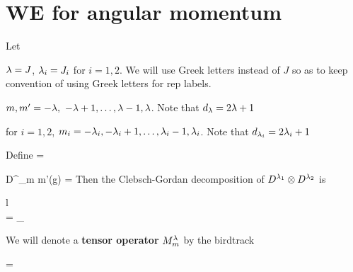 \section{WE for angular momentum}
Let

$\lambda=J$, $\lambda_i=J_i$ for $i=1,2$.
We will use Greek letters instead of $J$
so as to keep
convention
of using Greek
letters for rep labels. 

$m, m'= -\lambda, \
-\lambda+1,\ldots, \lambda-1, \lambda$. Note that
$d_\lambda = 2\lambda + 1$
 
for $i=1,2$, $m_i= -\lambda_i, -\lambda_i +1,\ldots, \lambda_i-1, \lambda_i$.  Note
that
$d_{\lambda_i} = 2\lambda_i + 1$ 



Define
\beq
{}
\quad
=\quad
\bcen
{}
\ecen
\eeq

\beq
D^\lam_{m m'}(g)
\quad =\quad
{}
\eeq
Then
the Clebsch-Gordan decomposition of $D^{\lambda_1}\otimes D^{\lambda_2}$ is

\beq
\begin{array}{l}
\\
\bcen
{}
\ecen
=
\sum_\lam
\bcen
{}
\ecen
\end{array}
\eeq

We will denote a
{\bf tensor operator} $M^\lambda_m$ by
the birdtrack

\beq
{}
=
\bcen
{}
\ecen
\eeq

